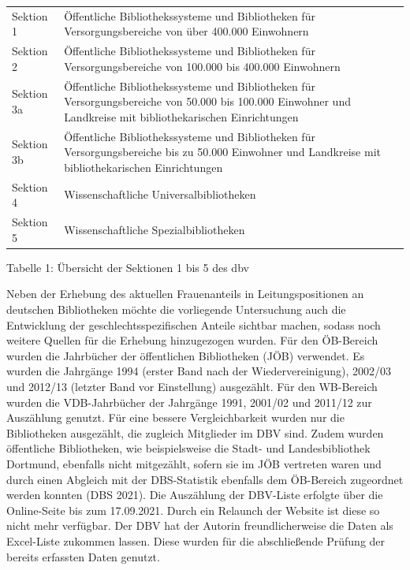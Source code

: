 \documentclass[a4paper,
fontsize=11pt,
oneside,
numbers=noperiodatend,
parskip=half-,
bibliography=totoc,
final
]{scrartcl}
\begin{document}
\begin{center}
\begin{tabular}{p{3cm}p{9cm}}
Sektion 1 & Öffentliche Bibliothekssysteme und Bibliotheken für
Versorgungsbereiche von über 400.000 Einwohnern \\
Sektion 2 & Öffentliche Bibliothekssysteme und Bibliotheken für
Versorgungsbereiche von 100.000 bis 400.000 Einwohnern \\
Sektion 3a & Öffentliche Bibliothekssysteme und Bibliotheken für
Versorgungsbereiche von 50.000 bis 100.000 Einwohner und Landkreise mit
bibliothekarischen Einrichtungen \\
Sektion 3b & Öffentliche Bibliothekssysteme und Bibliotheken für
Versorgungsbereiche bis zu 50.000 Einwohner und Landkreise mit
bibliothekarischen Einrichtungen \\
Sektion 4 & Wissenschaftliche Universalbibliotheken \\
Sektion 5 & Wissenschaftliche Spezialbibliotheken \\
\end{tabular}
\end{center}

Tabelle 1: Übersicht der Sektionen 1 bis 5 des dbv

Neben der Erhebung des aktuellen Frauenanteils in Leitungspositionen an
deutschen Bibliotheken möchte die vorliegende Untersuchung auch die
Entwicklung der geschlechtsspezifischen Anteile sichtbar machen, sodass
noch weitere Quellen für die Erhebung hinzugezogen wurden. Für den
ÖB-Bereich wurden die Jahrbücher der öffentlichen Bibliotheken (JÖB)
verwendet. Es wurden die Jahrgänge 1994 (erster Band nach der
Wiedervereinigung), 2002/03 und 2012/13 (letzter Band vor Einstellung)
ausgezählt. Für den WB-Bereich wurden die VDB-Jahrbücher der Jahrgänge
1991, 2001/02 und 2011/12 zur Auszählung genutzt. Für eine bessere
Vergleichbarkeit wurden nur die Bibliotheken ausgezählt, die zugleich
Mitglieder im DBV sind. Zudem wurden öffentliche Bibliotheken, wie
beispielsweise die Stadt- und Landesbibliothek Dortmund, ebenfalls nicht
mitgezählt, sofern sie im JÖB vertreten waren und durch einen Abgleich
mit der DBS-Statistik ebenfalls dem ÖB-Bereich zugeordnet werden konnten
(DBS 2021). Die Auszählung der DBV-Liste erfolgte über die Online-Seite
bis zum 17.09.2021. Durch ein Relaunch der Website ist diese so nicht
mehr verfügbar. Der DBV hat der Autorin freundlicherweise die Daten als
Excel-Liste zukommen lassen. Diese wurden für die abschließende Prüfung
der bereits erfassten Daten genutzt.
\end{document}
